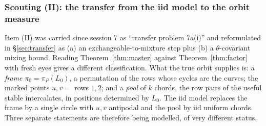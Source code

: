 \subsubsection{Scouting (II): the transfer from the iid model to the orbit measure}
\label{sec:s13transfer}

Item (II) was carried since session 7 as ``transfer problem 7a(i)''
and reformulated in \S\ref{sec:transfer} as (a) an
exchangeable-to-mixture step plus (b) a $\theta$-covariant mixing
bound.  Reading Theorem~\ref{thm:master} against
Theorem~\ref{thm:factor} with fresh eyes gives a different
classification.  What the true orbit supplies is: a \emph{frame}
$\pi_0=\pi_P(L_0)$, a permutation of the rows whose cycles are the
curves; the marked points $u,v=$ rows $1,2$; and a \emph{pool} of $k$
chords, the row pairs of the useful stable intercalates, in positions
determined by $L_0$.  The iid model replaces the frame by a single
circle with $u,v$ antipodal and the pool by iid uniform chords.  Three
separate statements are therefore being modelled, of very different
status.

